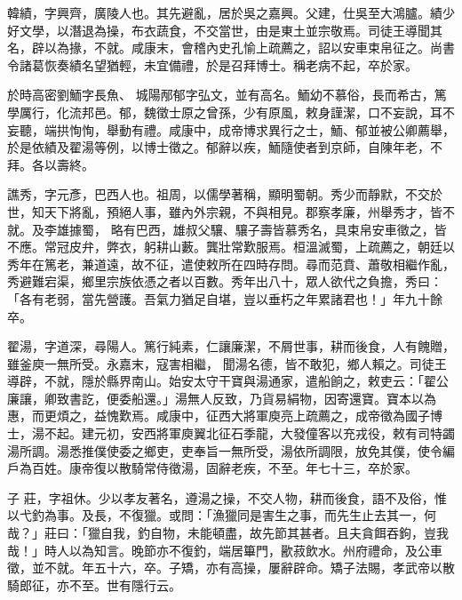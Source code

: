 \begin{pinyinscope}
 韓績，字興齊，廣陵人也。其先避亂，居於吳之嘉興。父建，仕吳至大鴻臚。績少好文學，以潛退為操，布衣蔬食，不交當世，由是東土並宗敬焉。司徒王導聞其名，辟以為掾，不就。咸康末，會稽內史孔愉上疏薦之，詔以安車束帛征之。尚書令諸葛恢奏績名望猶輕，未宜備禮，於是召拜博士。稱老病不起，卒於家。



 於時高密劉鮞字長魚、
 城陽邴郁字弘文，並有高名。鮞幼不慕俗，長而希古，篤學厲行，化流邦邑。郁，魏徵士原之曾孫，少有原風，敕身謹潔，口不妄說，耳不妄聽，端拱恂恂，舉動有禮。咸康中，成帝博求異行之士，鮞、郁並被公卿薦舉，於是依績及翟湯等例，以博士徵之。郁辭以疾，鮞隨使者到京師，自陳年老，不拜。各以壽終。



 譙秀，字元彥，巴西人也。祖周，以儒學著稱，顯明蜀朝。秀少而靜默，不交於世，知天下將亂，預絕人事，雖內外宗親，不與相見。郡察孝廉，州舉秀才，皆不就。及李雄據蜀，
 略有巴西，雄叔父驤、驤子壽皆慕秀名，具束帛安車徵之，皆不應。常冠皮弁，弊衣，躬耕山藪。龔壯常歎服焉。桓溫滅蜀，上疏薦之，朝廷以秀年在篤老，兼道遠，故不征，遣使敕所在四時存問。尋而范賁、蕭敬相繼作亂，秀避難宕渠，鄉里宗族依憑之者以百數。秀年出八十，眾人欲代之負擔，秀曰：「各有老弱，當先營護。吾氣力猶足自堪，豈以垂朽之年累諸君也！」年九十餘卒。



 翟湯，字道深，尋陽人。篤行純素，仁讓廉潔，不屑世事，耕而後食，人有餽贈，雖釜庾一無所受。永嘉末，寇害相繼，
 聞湯名德，皆不敢犯，鄉人賴之。司徒王導辟，不就，隱於縣界南山。始安太守干寶與湯通家，遣船餉之，敕吏云：「翟公廉讓，卿致書訖，便委船還。」湯無人反致，乃貨易絹物，因寄還寶。寶本以為惠，而更煩之，益愧歎焉。咸康中，征西大將軍庾亮上疏薦之，成帝徵為國子博士，湯不起。建元初，安西將軍庾翼北征石季龍，大發僮客以充戎役，敕有司特蠲湯所調。湯悉推僕使委之鄉吏，吏奉旨一無所受，湯依所調限，放免其僕，使令編戶為百姓。康帝復以散騎常侍徵湯，固辭老疾，不至。年七十三，卒於家。



 子
 莊，字祖休。少以孝友著名，遵湯之操，不交人物，耕而後食，語不及俗，惟以弋釣為事。及長，不復獵。或問：「漁獵同是害生之事，而先生止去其一，何哉？」莊曰：「獵自我，釣自物，未能頓盡，故先節其甚者。且夫貪餌吞鉤，豈我哉！」時人以為知言。晚節亦不復釣，端居篳門，歠菽飲水。州府禮命，及公車徵，並不就。年五十六，卒。子矯，亦有高操，屢辭辟命。矯子法賜，孝武帝以散騎郎征，亦不至。世有隱行云。




\end{pinyinscope}
